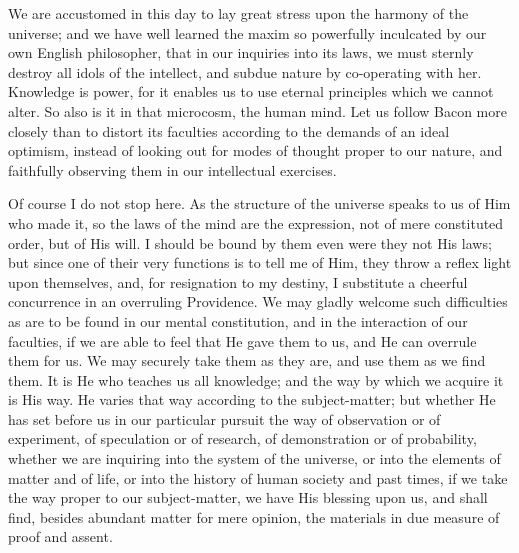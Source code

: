 We are accustomed in this day to lay great stress upon the harmony
of the universe; and we have well learned the maxim so powerfully
inculcated by our own English philosopher, that in our inquiries into
its laws, we must sternly destroy all idols of the intellect, and
subdue nature by co-operating with her. Knowledge is power, for it
enables us to use eternal principles which we cannot alter. So
also is it in that microcosm, the human mind. Let us follow Bacon more
closely than to distort its faculties according to the demands of an
ideal optimism, instead of looking out for modes of thought proper to
our nature, and faithfully observing them in our intellectual
exercises.

Of course I do not stop here. As the structure of the universe
speaks to us of Him who made it, so the laws of the mind are the
expression, not of mere constituted order, but of His will. I should
be bound by them even were they not His laws; but since one of their
very functions is to tell me of Him, they throw a reflex light upon
themselves, and, for resignation to my destiny, I substitute a
cheerful concurrence in an overruling Providence. We may gladly
welcome such difficulties as are to be found in our mental
constitution, and in the interaction of our faculties, if we are able
to feel that He gave them to us, and He can overrule them for us. We
may securely take them as they are, and use them as we find them. It
is He who teaches us all knowledge; and the way by which we acquire it
is His way. He varies that way according to the subject-matter; but
whether He has set before us in our particular pursuit the way of
observation or of experiment, of speculation or of research, of
demonstration or of probability, whether we are inquiring into the
system of the universe, or into the elements of matter and of life, or
into the history of human society and past times, if we take the way
proper to our subject-matter, we have His blessing upon us, and shall
find, besides abundant matter for mere opinion, the materials in
due measure of proof and assent.

